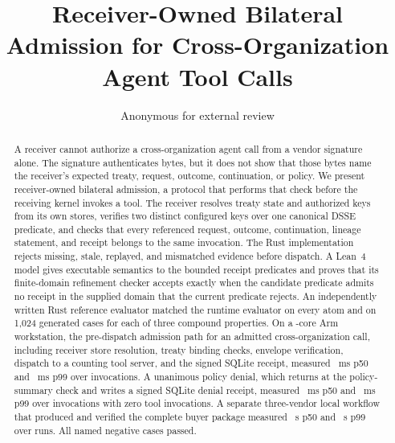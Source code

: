 \documentclass[sigconf,anonymous,review,nonacm]{acmart}
\title{Receiver-Owned Bilateral Admission for Cross-Organization Agent Tool Calls}
\author{Anonymous for external review}
\affiliation{\institution{Anonymous Institution}}
\begin{document}
\begin{abstract}
A receiver cannot authorize a cross-organization agent call from a vendor
signature alone. The signature authenticates bytes, but it does not show that
those bytes name the receiver's expected treaty, request, outcome,
continuation, or policy. We
present receiver-owned bilateral admission, a protocol that performs that
check before the receiving kernel invokes a tool. The receiver resolves treaty
state and authorized keys from its own stores, verifies two distinct
configured keys over one canonical DSSE predicate, and checks that every
referenced request, outcome, continuation, lineage statement, and receipt
belongs to the same invocation. The Rust implementation rejects missing,
stale, replayed, and mismatched evidence before dispatch. A Lean~4 model gives
executable semantics to the bounded receipt predicates and proves that its
finite-domain refinement checker accepts exactly when the candidate predicate
admits no receipt in the supplied domain that the current predicate rejects. An
independently written Rust reference evaluator matched the runtime
evaluator on every atom and on 1,024 generated cases for each of three
compound properties. On a \PSHostCores-core Arm \PSHostCpuModel{} workstation,
the pre-dispatch admission path for an admitted cross-organization call,
including receiver store resolution, treaty binding checks, envelope
verification, dispatch to a counting tool server, and the signed SQLite
receipt, measured \PSPredispatchAllowPFiftyMs~ms p50 and
\PSPredispatchAllowPNinetyNineMs~ms p99 over
\PSPredispatchAllowSampleCount{} invocations. A unanimous policy denial, which
returns at the policy-summary check and writes a signed SQLite denial
receipt, measured \PSPredispatchDenyPFiftyMs~ms p50 and
\PSPredispatchDenyPNinetyNineMs~ms p99 over
\PSPredispatchDenySampleCount{} invocations with zero tool invocations. A
separate three-vendor local workflow that produced and verified the complete
buyer package measured \PSBuyerWorkflowPFiftySec~s p50 and
\PSBuyerWorkflowPNinetyNineSec~s p99 over \PSPathSampleCount{} runs. All
\PSThreatCaseCount{} named negative cases passed.
\end{abstract}

\maketitle














\end{document}
